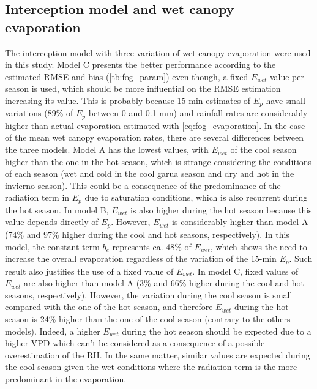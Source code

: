 \documentclass[a4paper,12pt]{article}
\begin{document}
\begin{linenumbers}
\subsection{Interception model and wet canopy evaporation} \label{dis_evaporation}
The interception model with three variation of wet canopy evaporation were used in this study. Model C presents the better performance according to the estimated RMSE and bias (\autoref{tb:fog_param}) even though, a fixed $E_{wet}$ value per season is used, which should be more influential on the RMSE estimation increasing its value. This is probably because 15-min estimates of $E_p$ have small variations (89\% of $E_p$ between 0 and 0.1 mm) and rainfall rates are considerably higher than actual evaporation estimated with \autoref{eq:fog_evaporation}. In the case of the mean wet canopy evaporation rates, there are several differences between the three models. Model A has the lowest values, with $E_{wet}$ of the cool season higher than the one in the hot season, which is strange considering the conditions of each season (wet and cold in the cool garua season and dry and hot in the invierno season). This could be a consequence of the predominance of the radiation term in $E_p$ due to saturation conditions, which is also recurrent during the hot season. In model B, $E_{wet}$ is also higher during the hot season because this value depends directly of $E_p$. However, $E_{wet}$ is considerably higher than model A (74\% and 97\% higher during the cool and hot seasons, respectively). In this model, the constant term $b_e$ represents ca. 48\% of $E_{wet}$, which shows the need to increase the overall evaporation regardless of the variation of the 15-min $E_p$. Such result also justifies the use of a fixed value of $E_{wet}$. In model C, fixed values of $E_{wet}$ are also higher than model A (3\% and 66\% higher during the cool and hot seasons, respectively). However, the variation during the cool season is small compared with the one of the hot season, and therefore $E_{wet}$ during the hot season is 24\% higher than the one of the cool season (contrary to the others models). Indeed, a higher  $E_{wet}$ during the hot season should be expected due to a higher VPD which can't be considered as a consequence of a possible overestimation of the RH. In the same matter, similar values are expected during the cool season given the wet conditions where the radiation term is the more predominant in the evaporation. 


\end{linenumbers}
\end{document}
